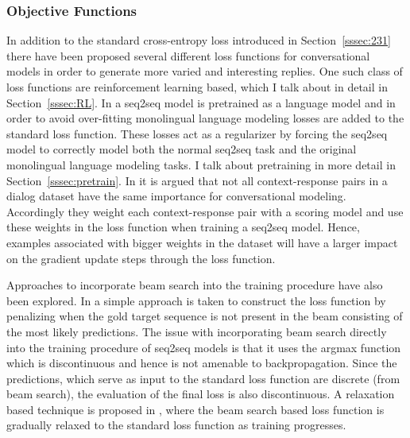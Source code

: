 \documentclass[12pt]{article}
\begin{document}
\subsubsection{Objective Functions} \label{sssec:functions}
In addition to the standard cross-entropy loss introduced in Section~\ref{sssec:231} there have been proposed several different loss functions for conversational models in order to generate more varied and interesting replies. One such class of loss functions are reinforcement learning based, which I talk about in detail in Section~\ref{sssec:RL}. In \cite{Ramachandran:2016} a seq2seq model is pretrained as a language model and in order to avoid over-fitting monolingual language modeling losses are added to the standard loss function. These losses act as a regularizer by forcing the seq2seq model to correctly model both the normal seq2seq task and the original monolingual language modeling tasks. I talk about pretraining in more detail in Section~\ref{sssec:pretrain}. In \cite{Lison:2017} it is argued that not all context-response pairs in a dialog dataset have the same importance for conversational modeling. Accordingly they weight each context-response pair with a scoring model and use these weights in the loss function when training a seq2seq model. Hence, examples associated with bigger weights in the dataset will have a larger impact on the gradient update steps through the loss function. 

Approaches to incorporate beam search into the training procedure have also been explored. In \cite{Wiseman:2016} a simple approach is taken to construct the loss function by penalizing when the gold target sequence is not present in the beam consisting of the most likely predictions. The issue with incorporating beam search directly into the training procedure of seq2seq models is that it uses the argmax function which is discontinuous and hence is not amenable to backpropagation. Since the predictions, which serve as input to the standard loss function are discrete (from beam search), the evaluation of the final loss is also discontinuous. A relaxation based technique is proposed in \cite{Goyal:2017}, where the beam search based loss function is gradually relaxed to the standard loss function as training progresses.
\end{document}
